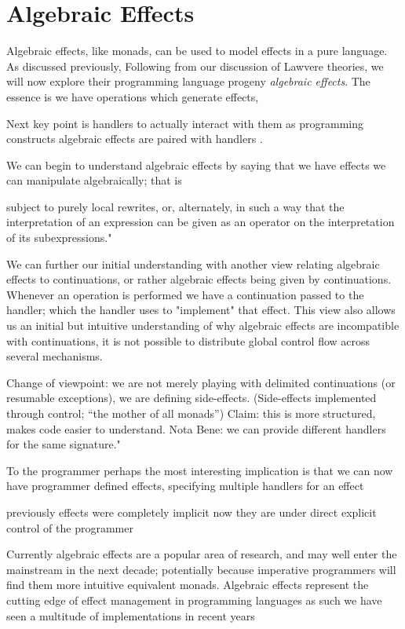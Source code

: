 \section{Algebraic Effects}
Algebraic effects, like monads, can be used to model effects in a pure language.
As discussed previously,
Following from our discussion of Lawvere theories,
we will now explore their programming language progeny \textit{algebraic effects}.
The essence is
we have operations which generate effects,

Next key point is handlers
to actually interact with them as programming constructs algebraic effects are paired with
handlers \cite{plotkin2009handlers}.


We can begin to understand algebraic effects by saying that
we have effects we can manipulate algebraically;
that is

    subject to purely local rewrites, or, alternately,
    in such a way that the interpretation of an expression
    can be given as an operator on the interpretation of its subexpressions."

We can further our initial understanding with another view
relating algebraic effects to continuations,
or rather algebraic effects being given by continuations.
Whenever an operation is performed we have a continuation
passed to the handler;
which the handler uses to "implement" that effect.
This view also allows us an initial but intuitive
understanding of why algebraic effects are incompatible with continuations,
it is not possible to distribute global control flow across
several mechanisms.




Change of viewpoint:
we are not merely playing with delimited continuations (or resumable exceptions),
we are defining side-effects.
(Side-effects implemented through control; “the mother of all monads”)
Claim: this is more structured, makes code easier to understand.
Nota Bene: we can provide different handlers for the same signature."

To the programmer perhaps the most interesting implication
is that we can now have programmer defined effects,
specifying multiple handlers for an effect

previously effects were completely implicit
now they are under direct explicit control of the programmer


Currently algebraic effects are a popular area of research,
and may well enter the mainstream in the next decade;
potentially because imperative programmers
will find them more intuitive equivalent monads.
Algebraic effects represent the cutting edge of effect management
in programming languages as such we have seen
a multitude of implementations in recent years

